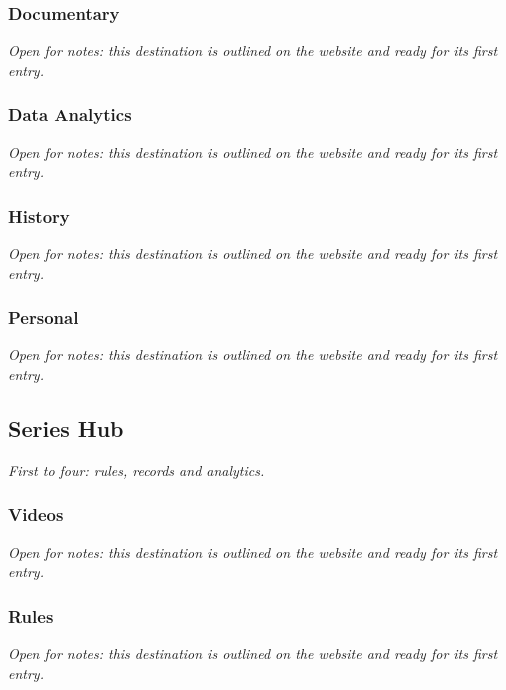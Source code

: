 \documentclass{article}
\begin{document}
\subsubsection{Documentary}\label{sec:documentary}
\textit{Open for notes: this destination is outlined on the website and ready for its first entry.}

\subsubsection{Data Analytics}\label{sec:data-analytics}
\textit{Open for notes: this destination is outlined on the website and ready for its first entry.}

\subsubsection{History}\label{sec:youtube-history}
\textit{Open for notes: this destination is outlined on the website and ready for its first entry.}

\subsubsection{Personal}\label{sec:personal}
\textit{Open for notes: this destination is outlined on the website and ready for its first entry.}

\subsection{Series Hub}\label{sec:series-hub}
\textit{First to four: rules, records and analytics.}

\subsubsection{Videos}\label{sec:videos}
\textit{Open for notes: this destination is outlined on the website and ready for its first entry.}

\subsubsection{Rules}\label{sec:rules}
\textit{Open for notes: this destination is outlined on the website and ready for its first entry.}
\end{document}
